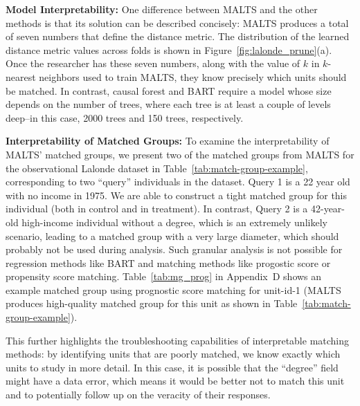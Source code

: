 \textbf{Model Interpretability:}
One difference between MALTS and the other methods is that its solution can be described concisely: MALTS produces a total of seven numbers that define the distance metric. The distribution of the learned distance metric values across folds is shown in Figure~\ref{fig:lalonde_prune}(a). Once the researcher has these seven numbers, along with the value of $k$ in $k$-nearest neighbors used to train MALTS, they know precisely which units should be matched. In contrast, causal forest and BART require a model whose size  depends on the number of trees, where each tree is at least a couple of levels deep--in this case, 2000 trees  and 150 trees, respectively.

\textbf{Interpretability of Matched Groups:}
To examine the interpretability of MALTS' matched groups, we present two of the matched groups from MALTS for the observational Lalonde dataset in Table~\ref{tab:match-group-example}, corresponding to two ``query'' individuals in the dataset.
 Query 1 is a 22 year old with no income in 1975. We are able to construct a tight matched group for this individual (both in control and in treatment). In contrast, Query 2 is a 42-year-old high-income individual without a degree, which is an extremely unlikely scenario, leading to a matched group with a very large diameter, which should probably not be used during analysis. Such granular analysis is not possible for regression methods like BART and matching methods like progostic score or propensity score matching. Table~\ref{tab:mg_prog} in Appendix~D shows an example matched group using prognostic score matching for unit-id-1 (MALTS produces high-quality matched group for this unit as shown in Table~\ref{tab:match-group-example}).

 This further highlights the troubleshooting capabilities of interpretable matching methods: by identifying units that are poorly matched, we know exactly which units to study in more detail. In this case, it is possible that the ``degree'' field might have a data error, which means it would be better not to match this unit and to potentially follow up on the veracity of their responses.

